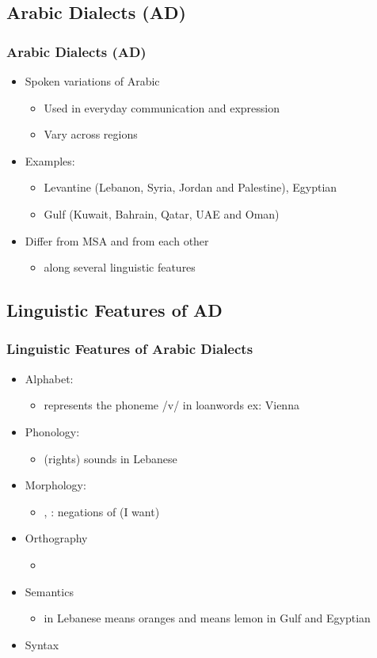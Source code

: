 \documentclass[xcolor=table]{beamer}
\newcommand{\bi}{\begin{itemize}}
\newcommand{\ei}{\end{itemize}}
\newcommand{\I}{\item}
\begin{document}
\subsection{Arabic Dialects (AD)}
\begin{frame}
\frametitle{Arabic Dialects (AD)}
\begin{itemize}
\item Spoken variations of Arabic 
\begin{itemize}
\item Used in everyday communication and expression
\item Vary across regions
\end{itemize}
\item Examples:
\begin{itemize}
\item Levantine (Lebanon, Syria, Jordan and Palestine), Egyptian
\item Gulf (Kuwait, Bahrain, Qatar, UAE and Oman)
\end{itemize}
\item Differ from {\color{red}MSA} and from {\color{red}each other}
\begin{itemize}
\item along several linguistic features
\end{itemize}
\end{itemize}

\end{frame}

\subsection*{Linguistic Features of AD}

\begin{frame}
\frametitle{Linguistic Features of Arabic Dialects}

\begin{itemize}[<+->]
\item Alphabet:
    \bi 
    \item {} represents the phoneme /v/ in loanwords ex:  Vienna
    \ei 
    \item Phonology: 
    \bi 
       \item {} (rights) sounds  in Lebanese
    \ei 
    \item Morphology: 
      \bi \I {}, : negations of  (I want)
      \ei 
    \item Orthography
    \bi 
    \I {}
    \ei
    \item Semantics
    \bi
    \I {} in Lebanese means oranges and means lemon in Gulf and Egyptian
    \ei
     \item Syntax
\end{itemize}
\end{frame}
\end{document}
